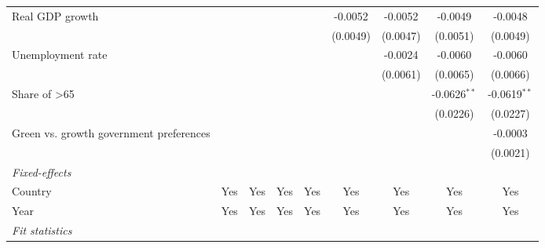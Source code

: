 \begin{table}[htbp]
\begin{tabular}{lcccccccc}
      Real GDP growth                                                          &          &          &                 &                 & -0.0052         & -0.0052         & -0.0049         & -0.0048\\   
                                                                               &          &          &                 &                 & (0.0049)        & (0.0047)        & (0.0051)        & (0.0049)\\   
      Unemployment rate                                                        &          &          &                 &                 &                 & -0.0024         & -0.0060         & -0.0060\\   
                                                                               &          &          &                 &                 &                 & (0.0061)        & (0.0065)        & (0.0066)\\   
      Share of >65                                                             &          &          &                 &                 &                 &                 & -0.0626$^{**}$  & -0.0619$^{**}$\\   
                                                                               &          &          &                 &                 &                 &                 & (0.0226)        & (0.0227)\\   
      Green vs. growth government preferences                                  &          &          &                 &                 &                 &                 &                 & -0.0003\\   
                                                                               &          &          &                 &                 &                 &                 &                 & (0.0021)\\   
      \midrule
      \emph{Fixed-effects}\\
      Country                                                                  & Yes      & Yes      & Yes             & Yes             & Yes             & Yes             & Yes             & Yes\\  
      Year                                                                     & Yes      & Yes      & Yes             & Yes             & Yes             & Yes             & Yes             & Yes\\  
      \midrule
      \emph{Fit statistics}\\

\end{tabular}
\end{table}
